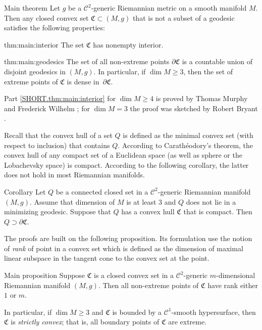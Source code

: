 \documentclass[a4paper,10pt]{article}
\begin{document}
\begin{thm}{Main theorem}\label{thm:main}
Let $g$ be a $\mathcal C^2$-generic Riemannian metric on a smooth manifold $M$.
Then any closed convex set $\mathfrak{C}\subset (M,g)$ that is not a subset of a geodesic
satisfies the following properties:

\begin{subthm}{thm:main:interior}
The set $\mathfrak{C}$ has nonempty interior.
\end{subthm}

\begin{subthm}{thm:main:geodesics}
The set of all non-extreme points $\partial\mathfrak{C}$ is a countable union of disjoint geodesics in $(M,g)$.
In particular, if $\dim M\ge 3$, then the set of
extreme points of $\mathfrak{C}$ is dense in~$\partial\mathfrak{C}$.
\end{subthm}

\end{thm}

Part \ref{SHORT.thm:main:interior} for $\dim M\ge 4$ is proved by Thomas Murphy and Frederick Wilhelm \cite{Wilhelm};
for $\dim M=3$ the proof was sketched by Robert Bryant \cite{Bryant}.

Recall that the convex hull of a set $Q$ is defined as the minimal convex set (with respect to inclusion) that contains $Q$.
According to Carathéodory's theorem, the convex hull of  any compact set of a Euclidean space (as well as sphere or the Lobachevsky space) is compact.
According to the following corollary, the latter does not hold in most Riemannian manifolds.

\begin{thm}{Corollary}\label{cor:caratheodory}
Let $Q$ be a connected closed set in a $\mathcal C^2$-generic Riemannian manifold $(M,g)$.
Assume that dimension of $M$ is at least $3$ and $Q$ does not lie in a minimizing geodesic.
Suppose that  $Q$ has a convex hull $\mathfrak{C}$ that is compact.
Then $Q\supset \partial \mathfrak{C}$.
\end{thm}

The proofs are built on the following proposition.
Its formulation use the notion of \emph{rank} of point in a convex set which is defined as the dimension of maximal linear subspace in the tangent cone to the convex set at the point.

\begin{thm}{Main proposition}\label{prom:rank}
Suppose $\mathfrak{C}$ is a closed convex set in a $\mathcal C^2$-generic $m$-dimensional Riemannian manifold $(M,g)$.
Then all non-extreme points of $\mathfrak{C}$ have rank either $1$ or $m$.

In particular, if $\dim M\ge 3$ and $\mathfrak{C}$ is bounded by a $\mathcal{C}^1$-smooth hypersurface, then $\mathfrak{C}$ is \emph{strictly convex};
that is, all boundary points of $\mathfrak{C}$ are extreme.
\end{thm}
\end{document}
